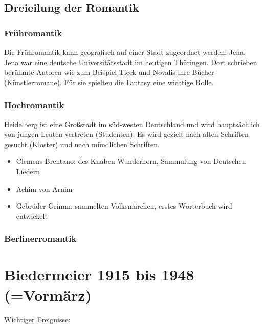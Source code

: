 \documentclass[12pt,a4paper]{article}
\begin{document}
\subsection{Dreieilung der Romantik}

\subsubsection{Frühromantik}

Die Frühromantik kann geografisch auf einer Stadt zugeordnet werden: Jena. Jena war eine deutsche Universitätsstadt im heutigen Thüringen. Dort schrieben berühmte Autoren wie zum Beispiel Tieck und Novalis ihre Bücher (Künstlerromane). Für sie spielten die Fantasy eine wichtige Rolle.

\subsubsection{Hochromantik}

Heidelberg ist eine Großstadt im süd-westen Deutschland und wird hauptsächlich von jungen Leuten vertreten (Studenten). Es wird gezielt nach alten Schriften gesucht (Kloster) und nach mündlichen Schriften.

\begin{itemize}
\item Clemens Brentano: des Knaben Wunderhorn, Sammulung von Deutschen Liedern
\item Achim von Arnim
\item Gebrüder Grimm: sammelten Volksmärchen, erstes Wörterbuch wird entwickelt
\end{itemize}

\subsubsection{Berlinerromantik}

\newpage

\section{Biedermeier 1915 bis 1948 (=Vormärz)}

Wichtiger Ereignisse:
\end{document}

